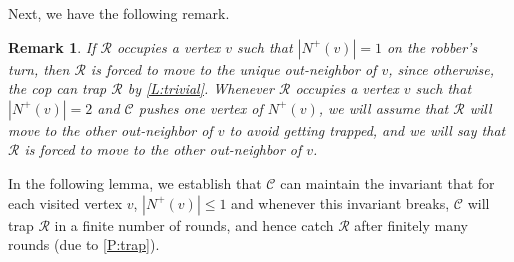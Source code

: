 \documentclass[a4paper,12pt]{amsart}
\newtheorem{remark}[theorem]{Remark}
\newcommand{\R}{\mathcal{R}}
\newcommand{\C}{\mathcal{C}}
\let\leq\leqslant
\begin{document}
Next, we have the following remark.
\begin{remark}\label{R:trivial}
     If $\R$ occupies a vertex $v$ such that $|N^+(v)| = 1$ on the robber's turn, then $\R$ is forced to move to the unique out-neighbor of $v$, since otherwise, the cop can trap $\R$ by \cref{L:trivial}. Whenever $\R$ occupies a vertex $v$ such that $|N^+(v)|=2$ and $\C$ pushes one vertex of $N^+(v)$, we will assume that $\R$ will move to the other out-neighbor of $v$ to avoid getting trapped, and we will say that $\R$ is {\em forced} to move to the other out-neighbor  of $v$.
\end{remark}

In the following lemma, we establish that $\C$ can maintain the invariant that for each visited vertex $v$, $|N^+(v)|\leq 1$ and whenever this invariant breaks, $\C$ will trap $\R$ in a finite number of rounds, and hence catch $\R$ after finitely many rounds (due to \cref{P:trap}). 
\end{document}
